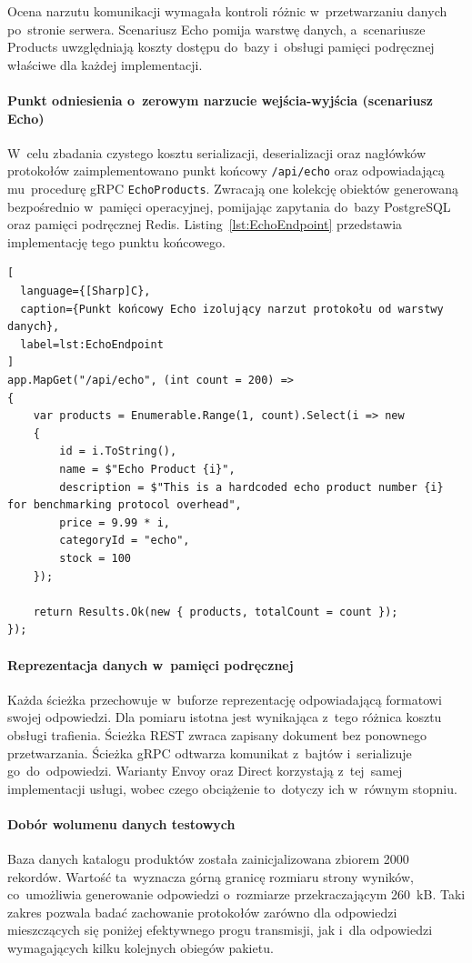 Ocena narzutu komunikacji wymagała kontroli różnic w~przetwarzaniu danych po~stronie serwera. Scenariusz Echo pomija warstwę danych, a~scenariusze Products uwzględniają koszty dostępu do~bazy i~obsługi pamięci podręcznej właściwe dla każdej implementacji.

\paragraph{Punkt odniesienia o~zerowym narzucie wejścia-wyjścia (scenariusz Echo)}
W~celu zbadania czystego kosztu serializacji, deserializacji oraz nagłówków protokołów zaimplementowano punkt końcowy \texttt{/api/echo} oraz odpowiadającą mu~procedurę gRPC \texttt{EchoProducts}. Zwracają one kolekcję obiektów generowaną bezpośrednio w~pamięci operacyjnej, pomijając zapytania do~bazy PostgreSQL oraz pamięci podręcznej Redis. Listing~\ref{lst:EchoEndpoint} przedstawia implementację tego punktu końcowego.

\begin{lstlisting}[
  language={[Sharp]C},
  caption={Punkt końcowy Echo izolujący narzut protokołu od warstwy danych},
  label=lst:EchoEndpoint
]
app.MapGet("/api/echo", (int count = 200) =>
{
    var products = Enumerable.Range(1, count).Select(i => new
    {
        id = i.ToString(),
        name = $"Echo Product {i}",
        description = $"This is a hardcoded echo product number {i} for benchmarking protocol overhead",
        price = 9.99 * i,
        categoryId = "echo",
        stock = 100
    });
    
    return Results.Ok(new { products, totalCount = count });
});
\end{lstlisting}

\paragraph{Reprezentacja danych w~pamięci podręcznej}
Każda ścieżka przechowuje w~buforze reprezentację odpowiadającą formatowi swojej odpowiedzi. Dla pomiaru istotna jest wynikająca z~tego różnica kosztu obsługi trafienia. Ścieżka REST zwraca zapisany dokument bez ponownego przetwarzania. Ścieżka gRPC odtwarza komunikat z~bajtów i~serializuje go~do~odpowiedzi. Warianty Envoy oraz Direct korzystają z~tej~samej implementacji usługi, wobec czego obciążenie to~dotyczy ich w~równym stopniu.

\paragraph{Dobór wolumenu danych testowych}
Baza danych katalogu produktów została zainicjalizowana zbiorem 2000 rekordów. Wartość ta~wyznacza górną granicę rozmiaru strony wyników, co~umożliwia generowanie odpowiedzi o~rozmiarze przekraczającym 260~kB. Taki zakres pozwala badać zachowanie protokołów zarówno dla odpowiedzi mieszczących się poniżej efektywnego progu transmisji, jak i~dla odpowiedzi wymagających kilku kolejnych obiegów pakietu.

